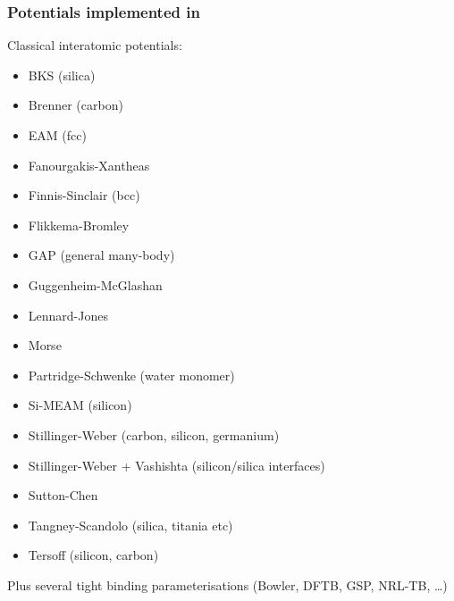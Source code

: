 \documentclass[letterpaper,10pt,english]{sphinxmanual}
\begin{document}
\subsubsection{Potentials implemented in }
\label{\detokenize{potentials:potentials-implemented-in-quip}}
Classical interatomic potentials:
\begin{itemize}
\item {} 
BKS (silica)

\item {} 
Brenner (carbon)

\item {} 
EAM (fcc)

\item {} 
Fanourgakis-Xantheas

\item {} 
Finnis-Sinclair (bcc)

\item {} 
Flikkema-Bromley

\item {} 
GAP (general many-body)

\item {} 
Guggenheim-McGlashan

\item {} 
Lennard-Jones

\item {} 
Morse

\item {} 
Partridge-Schwenke (water monomer)

\item {} 
Si-MEAM (silicon)

\item {} 
Stillinger-Weber (carbon, silicon, germanium)

\item {} 
Stillinger-Weber + Vashishta (silicon/silica interfaces)

\item {} 
Sutton-Chen

\item {} 
Tangney-Scandolo (silica, titania etc)

\item {} 
Tersoff (silicon, carbon)

\end{itemize}

Plus several tight binding parameterisations (Bowler, DFTB, GSP,
NRL-TB, …)
\end{document}
